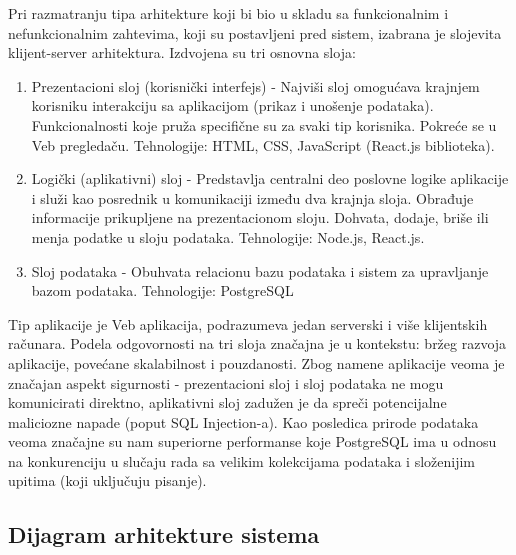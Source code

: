 \documentclass{article}
\begin{document}
Pri razmatranju tipa arhitekture koji bi bio u skladu sa funkcionalnim i nefunkcionalnim zahtevima, koji su postavljeni pred sistem, izabrana je slojevita klijent-server arhitektura. Izdvojena su tri osnovna sloja:
\begin{enumerate}
    \item Prezentacioni sloj (korisnički interfejs) - Najviši sloj omogućava krajnjem korisniku interakciju sa aplikacijom (prikaz i unošenje podataka). Funkcionalnosti koje pruža specifične su za svaki tip korisnika. Pokreće se u Veb pregledaču. Tehnologije: HTML, CSS, JavaScript (React.js biblioteka).
    \item Logički (aplikativni) sloj - Predstavlja centralni deo poslovne logike aplikacije i služi kao posrednik u komunikaciji između dva krajnja sloja. Obrađuje informacije prikupljene na prezentacionom sloju. Dohvata, dodaje, briše ili menja podatke u sloju podataka. Tehnologije: Node.js, React.js.
    \item Sloj podataka - Obuhvata relacionu bazu podataka i sistem za upravljanje bazom podataka. Tehnologije: PostgreSQL
\end{enumerate}

Tip aplikacije je Veb aplikacija, podrazumeva jedan serverski i više klijentskih računara. Podela odgovornosti na tri sloja značajna je u kontekstu: bržeg razvoja aplikacije, povećane skalabilnost i pouzdanosti. Zbog namene aplikacije veoma je značajan aspekt sigurnosti - prezentacioni sloj i sloj podataka ne mogu komunicirati direktno, aplikativni sloj zadužen je da spreči potencijalne maliciozne napade (poput SQL Injection-a). Kao posledica prirode podataka veoma značajne su nam superiorne performanse koje PostgreSQL ima u odnosu na konkurenciju u slučaju rada sa velikim kolekcijama podataka i složenijim upitima (koji uključuju pisanje).

\newpage
\subsection{Dijagram arhitekture sistema}
\end{document}
